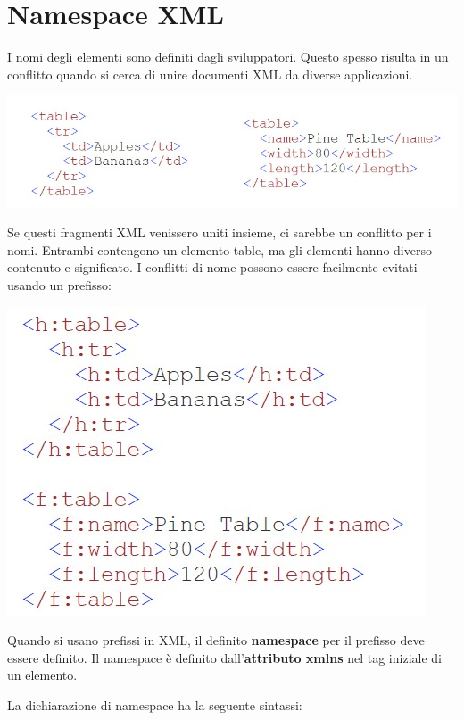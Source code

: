 \section{Namespace XML}
I nomi degli elementi sono definiti dagli sviluppatori. Questo spesso risulta in un conflitto quando si cerca di unire documenti XML da diverse applicazioni.
\begin{center}
    \includegraphics[scale=0.4]{Images/TecnologieWeb/5/Table.jpg}
\end{center}
Se questi fragmenti XML venissero uniti insieme, ci sarebbe un conflitto per i nomi. Entrambi contengono un elemento table, ma gli elementi hanno diverso contenuto e significato. I conflitti di nome possono essere facilmente evitati usando un prefisso:
\begin{center}
    \includegraphics[scale=0.4]{Images/TecnologieWeb/5/TableAliad.jpg}
\end{center}
Quando si usano prefissi in XML, il definito \textbf{namespace} per il prefisso deve essere definito. Il namespace è definito dall'\textbf{attributo xmlns} nel tag iniziale di un elemento.

La dichiarazione di namespace ha la seguente sintassi:\\

